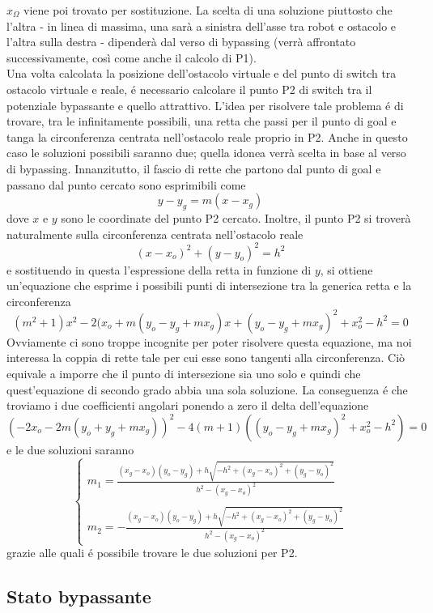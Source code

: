 \documentclass[14pt,a4paper]{extarticle}
\begin{document}
\(x_{\Omega}\) viene poi trovato per sostituzione. La scelta di una soluzione piuttosto che l'altra - in linea di massima, una sarà a sinistra dell'asse tra robot e ostacolo e l'altra sulla destra - dipenderà dal verso di bypassing (verrà affrontato successivamente, così come anche il calcolo di P1).\\
Una volta calcolata la posizione dell'ostacolo virtuale e del punto di switch tra ostacolo virtuale e reale, é necessario calcolare il punto P2 di switch tra il potenziale bypassante e quello attrattivo. L'idea per risolvere tale problema é di trovare, tra le infinitamente possibili, una retta che passi per il punto di goal e tanga la circonferenza centrata nell'ostacolo reale proprio in P2. Anche in questo caso le soluzioni possibili saranno due; quella idonea verrà scelta in base al verso di bypassing. Innanzitutto, il fascio di rette che partono dal punto di goal e passano dal punto cercato sono esprimibili come \[y-y_g = m(x-x_g)\] dove \(x\) e \(y\) sono le coordinate del punto P2 cercato. Inoltre, il punto P2 si troverà naturalmente sulla circonferenza centrata nell'ostacolo reale \[(x-x_o)^2+(y-y_o)^2=h^2\] e sostituendo in questa l'espressione della retta in funzione di \(y\), si ottiene un'equazione che esprime i possibili punti di intersezione tra la generica retta e la circonferenza	
\[(m^2+1)x^2 -2(x_o+m(y_o-y_g+mx_g)x + (y_o-y_g+mx_g)^2+x_o^2-h^2=0\]
Ovviamente ci sono troppe incognite per poter risolvere questa equazione, ma noi interessa la coppia di rette tale per cui esse sono tangenti alla circonferenza. Ciò equivale a imporre che il punto di intersezione sia uno solo e quindi che quest'equazione di secondo grado abbia una sola soluzione. La conseguenza é che troviamo i due coefficienti angolari ponendo a zero il delta dell'equazione\[(-2x_o - 2m(y_o+y_g+mx_g))^2 - 4(m+1)((y_o-y_g+mx_g)^2+x_o^2-h^2)=0\] e le due soluzioni saranno 
\[\begin{cases} 
m_1=\frac{(x_g-x_o)(y_o-y_g)+h\sqrt{-h^2+(x_g-x_o)^2+(y_g-y_o)^2}}{h^2-(x_g-x_o)^2} \\\\
m_2=-\frac{(x_g-x_o)(y_o-y_g)+h\sqrt{-h^2+(x_g-x_o)^2+(y_g-y_o)^2}}{h^2-(x_g-x_o)^2} 
\end{cases}\]
grazie alle quali é possibile trovare le due soluzioni per P2.\\

	
\subsection{Stato bypassante}
\end{document}
